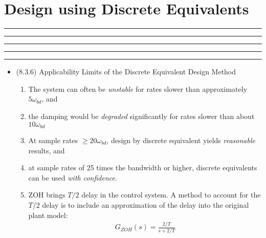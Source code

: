 \setcounter{chapter}{7}
\setcounter{section}{2}
\section{Design using Discrete Equivalents}
\vspace{-8pt} \hrule \hrule \hrule \hrule \hrule  \vspace{12pt}
\begin{itemize}
	\item (8.3.6) Applicability Limits of the Discrete Equivalent Design Method
	\begin{enumerate}
		\item The system can often be \emph{unstable} for rates slower than approximately $5\omega_{bd}$, and 
		\item the damping would be \emph{degraded} significantly for rates slower than about $10\omega_{bd}$ 
		\item At sample rates $\geq 20 \omega_{bd}$, design by discrete equivalent yields \emph{reasonable} results, and 
		\item at sample rates of 25 times the bandwidth or higher, discrete equivalents can be used \emph{with confidence}. 
		\item ZOH brings $T/2$ delay in the control system. A method to account for the $T/2$ delay is to include an approximation of the delay into the original plant model: 
		\begin{align*}
			G_{ZOH} (s) = \frac{2/T}{s+ 2/T}		
		\end{align*}
	\end{enumerate}
\end{itemize}